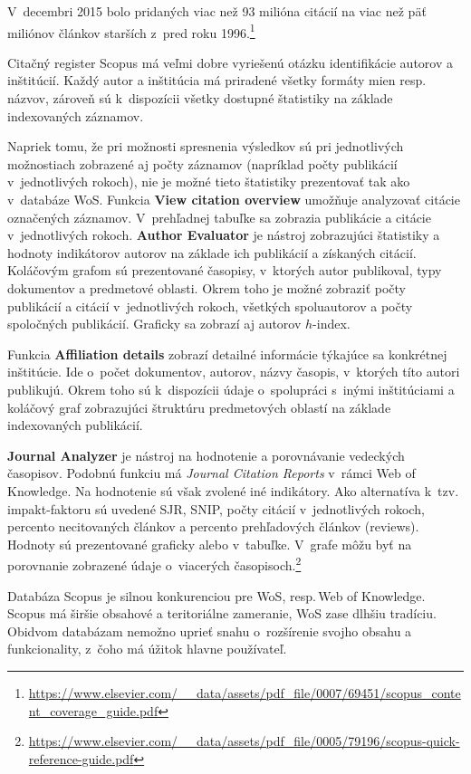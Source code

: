 V~decembri 2015 bolo pridaných viac než 93 milióna citácií na viac než päť
miliónov článkov starších z~pred roku
1996.\footnote{\url{https://www.elsevier.com/__data/assets/pdf_file/0007/69451/scopus_content_coverage_guide.pdf}}

Citačný register Scopus má veľmi dobre vyriešenú otázku identifikácie autorov a
inštitúcií.  Každý autor a inštitúcia má priradené všetky formáty mien
resp.\,názvov, zároveň sú k~dispozícii všetky dostupné štatistiky na základe
indexovaných záznamov.

Napriek tomu, že pri možnosti spresnenia výsledkov sú pri jednotlivých
možnostiach zobrazené aj počty záznamov (napríklad počty publikácií
v~jednotlivých rokoch), nie je možné tieto štatistiky prezentovať tak ako
v~databáze WoS.  Funkcia \textbf{View citation overview} umožňuje analyzovať
citácie označených záznamov.  V~prehľadnej tabuľke sa zobrazia publikácie a
citácie v~jednotlivých rokoch.  \textbf{Author Evaluator} je nástroj zobrazujúci
štatistiky a hodnoty indikátorov autorov na základe ich publikácií a získaných
citácií.  Koláčovým grafom sú prezentované časopisy, v~ktorých autor publikoval,
typy dokumentov a predmetové oblasti.  Okrem toho je možné zobraziť počty
publikácií a citácií v~jednotlivých rokoch, všetkých spoluautorov a počty
spoločných publikácií.  Graficky sa zobrazí aj autorov $h$-index.

Funkcia \textbf{Affiliation details} zobrazí detailné informácie týkajúce sa
konkrétnej inštitúcie.  Ide o~počet dokumentov, autorov, názvy časopis,
v~ktorých títo autori publikujú.  Okrem toho sú k~dispozícii údaje o~spolupráci
s~inými inštitúciami a koláčový graf zobrazujúci štruktúru predmetových oblastí
na základe indexovaných publikácií.

\textbf{Journal Analyzer} je nástroj na hodnotenie a porovnávanie vedeckých
časopisov.  Podobnú funkciu má \emph{Journal Citation Reports} v~rámci Web of
Knowledge.  Na hodnotenie sú však zvolené iné indikátory.  Ako alternatíva
k~tzv.\,impakt-faktoru sú uvedené SJR, SNIP, počty citácií v~jednotlivých
rokoch, percento necitovaných článkov a percento prehľadových článkov (reviews).
Hodnoty sú prezentované graficky alebo v~tabuľke.  V~grafe môžu byť na
porovnanie zobrazené údaje o~viacerých
časopisoch.\footnote{\url{https://www.elsevier.com/__data/assets/pdf_file/0005/79196/scopus-quick-reference-guide.pdf}}

Databáza Scopus je silnou konkurenciou pre WoS, resp.\,Web of Knowledge.  Scopus
má širšie obsahové a teritoriálne zameranie, WoS zase dlhšiu tradíciu.  Obidvom
databázam nemožno uprieť snahu o~rozšírenie svojho obsahu a funkcionality,
z~čoho má úžitok hlavne používateľ.

